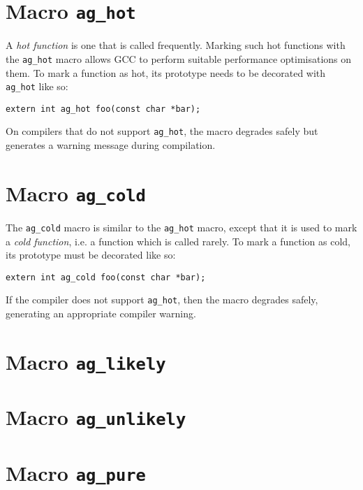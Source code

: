 \section{Macro \texttt{ag\_hot}}
A \emph{hot function} is one that is called frequently. Marking such hot
functions with the \texttt{ag\_hot} macro allows GCC to perform suitable
performance optimisations on them. To mark a function as hot, its prototype
needs to be decorated with \texttt{ag\_hot} like so:
\par
\texttt{extern int ag\_hot foo(const char *bar);}

On compilers that do not support \texttt{ag\_hot}, the macro degrades safely
but generates a warning message during compilation.


\section{Macro \texttt{ag\_cold}}
The \texttt{ag\_cold} macro is similar to the \texttt{ag\_hot} macro, except
that it is used to mark a \emph{cold function}, i.e. a function which is called
rarely. To mark a function as cold, its prototype must be decorated like so:
\par
\texttt{extern int ag\_cold foo(const char *bar);}

If the compiler does not support \texttt{ag\_hot}, then the macro degrades
safely, generating an appropriate compiler warning.

\section{Macro \texttt{ag\_likely}}
\section{Macro \texttt{ag\_unlikely}}
\section{Macro \texttt{ag\_pure}}

